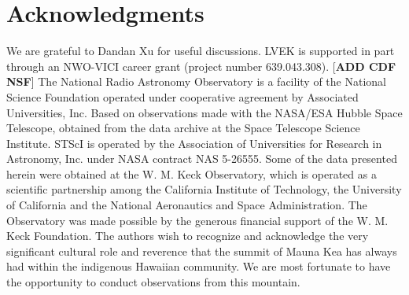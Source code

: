 \documentclass[a4paper,fleqn,usenatbib,useAMS]{mnras}
\begin{document}
\section*{Acknowledgments}
We are grateful to Dandan Xu for useful discussions. LVEK is supported in part through an NWO-VICI career grant (project number 639.043.308). [{\bf ADD CDF NSF}]  The National Radio Astronomy Observatory is a facility of the National Science Foundation operated under cooperative agreement by Associated Universities, Inc. Based on observations made with the NASA/ESA Hubble Space Telescope, obtained from the data archive at the Space Telescope Science Institute. STScI is operated by the Association of Universities for Research in Astronomy, Inc. under NASA contract NAS 5-26555. Some of the data presented herein were obtained at the W. M. Keck Observatory, which is operated as a scientific partnership among the California Institute of Technology, the University of California and the National Aeronautics and Space Administration. The Observatory was made possible by the generous financial support of the W. M. Keck Foundation. The authors wish to recognize and acknowledge the very significant cultural role and reverence that the summit of Mauna Kea has always had within the indigenous Hawaiian community.  We are most fortunate to have the opportunity to conduct observations from this mountain.






\bsp
\label{lastpage}
\end{document}
